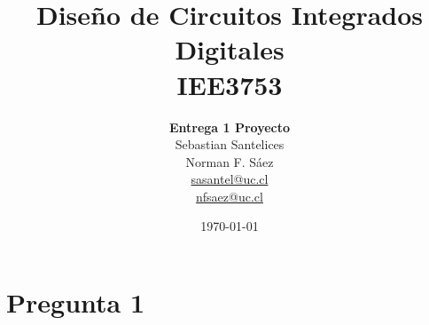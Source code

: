 \documentclass[a4paper,10pt]{article}
\title{Diseño de Circuitos Integrados Digitales\\IEE3753}
\author{\textbf{Entrega 1 Proyecto}\\Sebastian Santelices\\Norman F. Sáez\\\url{sasantel@uc.cl}\\\url{nfsaez@uc.cl}}
\date{\today}
\begin{document}
\maketitle
\newpage
\tableofcontents
\listoffigures
\section{Pregunta 1}
\end{document}
